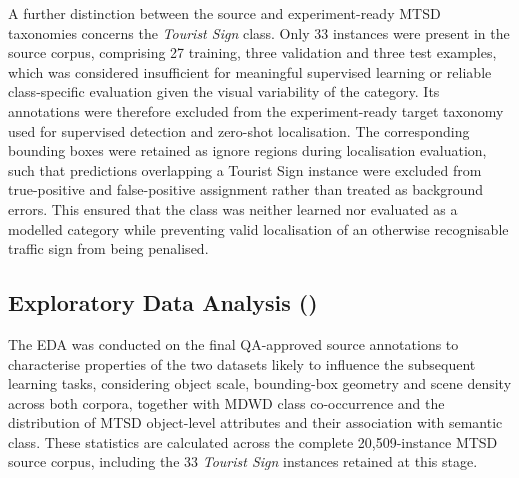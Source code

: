 A further distinction between the source and experiment-ready \gls{MTSD} taxonomies concerns the \emph{Tourist Sign} class. Only 33 instances were present in the source corpus, comprising 27 training, three validation and three test examples, which was considered insufficient for meaningful supervised learning or reliable class-specific evaluation given the visual variability of the category. Its annotations were therefore excluded from the experiment-ready target taxonomy used for supervised detection and zero-shot localisation. The corresponding bounding boxes were retained as ignore regions during localisation evaluation, such that predictions overlapping a Tourist Sign instance were excluded from true-positive and false-positive assignment rather than treated as background errors. This ensured that the class was neither learned nor evaluated as a modelled category while preventing valid localisation of an otherwise recognisable traffic sign from being penalised.

\newpage
\subsection{Exploratory Data Analysis ()}
\label{sec:eda}
The \gls{EDA} was conducted on the final \gls{QA}-approved source annotations to characterise properties of the two datasets likely to influence the subsequent learning tasks, considering object scale, bounding-box geometry and scene density across both corpora, together with \gls{MDWD} class co-occurrence and the distribution of \gls{MTSD} object-level attributes and their association with semantic class. These statistics are calculated across the complete 20,509-instance \gls{MTSD} source corpus, including the 33 \emph{Tourist Sign} instances retained at this stage.

